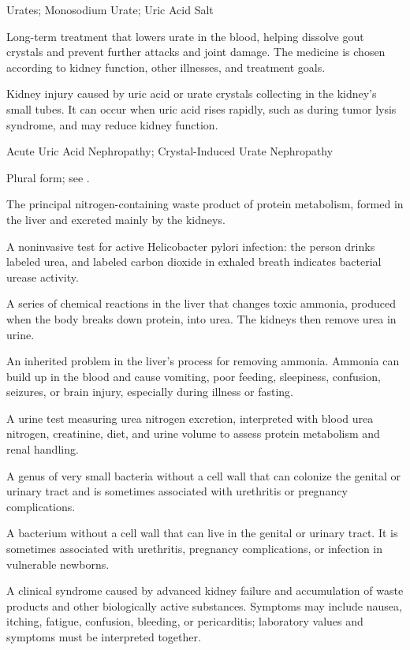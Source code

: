 \synonyms
Urates; Monosodium Urate; Uric Acid Salt

 Long-term treatment that lowers urate in the blood, helping dissolve gout crystals and prevent further attacks and joint damage. The medicine is chosen according to kidney function, other illnesses, and treatment goals.

 Kidney injury caused by uric acid or urate crystals collecting in the kidney’s small tubes. It can occur when uric acid rises rapidly, such as during tumor lysis syndrome, and may reduce kidney function.

\synonyms
Acute Uric Acid Nephropathy; Crystal-Induced Urate Nephropathy

 Plural form; see .

 The principal nitrogen-containing waste product of protein metabolism, formed in the liver and excreted mainly by the kidneys.

 A noninvasive test for active Helicobacter pylori infection: the person drinks labeled urea, and labeled carbon dioxide in exhaled breath indicates bacterial urease activity.

 A series of chemical reactions in the liver that changes toxic ammonia, produced when the body breaks down protein, into urea. The kidneys then remove urea in urine.

 An inherited problem in the liver’s process for removing ammonia. Ammonia can build up in the blood and cause vomiting, poor feeding, sleepiness, confusion, seizures, or brain injury, especially during illness or fasting.

 A urine test measuring urea nitrogen excretion, interpreted with blood urea nitrogen, creatinine, diet, and urine volume to assess protein metabolism and renal handling.

 A genus of very small bacteria without a cell wall that can colonize the genital or urinary tract and is sometimes associated with urethritis or pregnancy complications.

 A bacterium without a cell wall that can live in the genital or urinary tract. It is sometimes associated with urethritis, pregnancy complications, or infection in vulnerable newborns.

 A clinical syndrome caused by advanced kidney failure and accumulation of waste products and other biologically active
substances. Symptoms may include nausea, itching, fatigue, confusion, bleeding, or
pericarditis; laboratory values and symptoms must be interpreted together.

